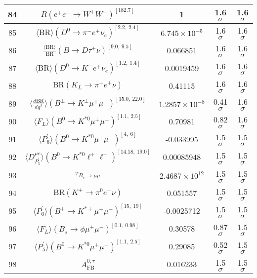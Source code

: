 \begin{longtable}{|c|c|c|c|c|}
84 &	 $R(e^+e^- \to W^+W^-)^{[182.7]}$ &	 1 &	 \cellcolor{red!0}1.6 $ \sigma$ &	 1.6 $ \sigma$ \\ \hline
85 &	 $\langle\mathrm{BR}\rangle(D^0\to \pi^- e^+\nu_e)^{[2.2,\  2.4]}$ &	 $6.745\times 10^{-5}$ &	 \cellcolor{red!0}1.6 $ \sigma$ &	 1.6 $ \sigma$ \\ \hline
86 &	 $\frac{\langle \mathrm{BR} \rangle}{\mathrm{BR}}(B\to D\tau^+\nu)^{[9.0,\  9.5]}$ &	 0.066851 &	 \cellcolor{green!0}1.6 $ \sigma$ &	 1.6 $ \sigma$ \\ \hline
87 &	 $\langle\mathrm{BR}\rangle(D^0\to K^- e^+\nu_e)^{[1.2,\  1.4]}$ &	 0.0019459 &	 \cellcolor{green!0}1.6 $ \sigma$ &	 1.6 $ \sigma$ \\ \hline
88 &	 $\mathrm{BR}(K_L\to \pi^+e^+\nu)$ &	 0.41115 &	 \cellcolor{red!0}1.6 $ \sigma$ &	 1.6 $ \sigma$ \\ \hline
89 &	 $\langle \frac{d\mathrm{BR}}{dq^2} \rangle(B^\pm\to K^\pm \mu^+\mu^-)^{[15.0,\  22.0]}$ &	 $1.2857\times 10^{-8}$ &	 \cellcolor{green!50}0.41 $ \sigma$ &	 1.6 $ \sigma$ \\ \hline
90 &	 $\langle F_L\rangle(B^0\to K^{\ast 0}\mu^+\mu^-)^{[1.1,\  2.5]}$ &	 0.70981 &	 \cellcolor{green!37}0.82 $ \sigma$ &	 1.6 $ \sigma$ \\ \hline
91 &	 $\langle P_6^\prime\rangle(B^0\to K^{\ast 0}\mu^+\mu^-)^{[4,\  6]}$ &	 -0.033995 &	 \cellcolor{green!1}1.5 $ \sigma$ &	 1.5 $ \sigma$ \\ \hline
92 &	 $\langle D_{P_5^\prime}^{\mu e} \rangle(B^0\to K^{\ast 0}\ell^+\ell^-)^{[14.18,\  19.0]}$ &	 0.00085948 &	 \cellcolor{green!0}1.5 $ \sigma$ &	 1.5 $ \sigma$ \\ \hline
93 &	 $\tau_{B_s \to \mu\mu}$ &	 $2.4687\times 10^{12}$ &	 \cellcolor{red!0}1.5 $ \sigma$ &	 1.5 $ \sigma$ \\ \hline
94 &	 $\mathrm{BR}(K^+\to \pi^0e^+\nu)$ &	 0.051557 &	 \cellcolor{red!0}1.5 $ \sigma$ &	 1.5 $ \sigma$ \\ \hline
95 &	 $\langle P_6^\prime\rangle(B^+\to K^{\ast +}\mu^+\mu^-)^{[15,\  19]}$ &	 -0.0025712 &	 \cellcolor{green!0}1.5 $ \sigma$ &	 1.5 $ \sigma$ \\ \hline
96 &	 $\langle \overline{F_L}\rangle(B_s\to \phi \mu^+\mu^-)^{[0.1,\  0.98]}$ &	 0.30578 &	 \cellcolor{green!32}0.87 $ \sigma$ &	 1.5 $ \sigma$ \\ \hline
97 &	 $\langle P_5^\prime\rangle(B^0\to K^{\ast 0}\mu^+\mu^-)^{[1.1,\  2.5]}$ &	 0.29085 &	 \cellcolor{green!50}0.52 $ \sigma$ &	 1.5 $ \sigma$ \\ \hline
98 &	 $A_\mathrm{FB}^{0,\tau}$ &	 0.016233 &	 \cellcolor{green!0}1.5 $ \sigma$ &	 1.5 $ \sigma$ \\ \hline

\end{longtable}
